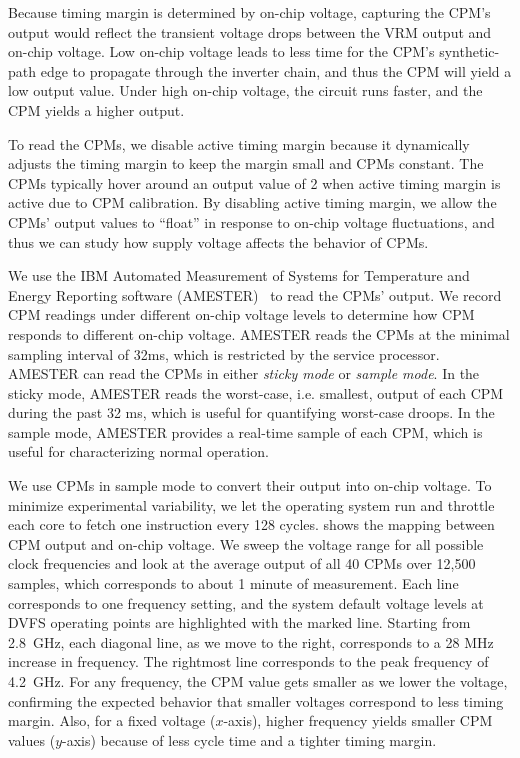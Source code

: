 Because timing margin is determined by on-chip voltage, capturing the CPM's output would reflect the transient voltage drops between the VRM output and on-chip voltage. Low on-chip voltage leads to less time for the CPM's synthetic-path edge to propagate through the inverter chain, and thus the CPM will yield a low output value. Under high on-chip voltage, the circuit runs faster, and the CPM yields a higher output.

To read the CPMs, we disable active timing margin because it dynamically adjusts the timing margin to keep the margin small and CPMs constant. The CPMs typically hover around an output value of 2 when active timing margin is active due to CPM calibration. By disabling active timing margin, we allow the CPMs' output values to ``float'' in response to on-chip voltage fluctuations, and thus we can study how supply voltage affects the behavior of CPMs. 

We use the IBM Automated Measurement of Systems for Temperature and Energy Reporting software (AMESTER)~\cite{floyd2011introducing, AMESTERgithub} to read the CPMs' output. We record CPM readings under different on-chip voltage levels to determine how CPM responds to different on-chip voltage. AMESTER reads the CPMs at the minimal sampling interval of 32ms, which is restricted by the service processor. AMESTER can read the CPMs in either {\it sticky mode} or {\it sample mode}. In the sticky mode, AMESTER reads the worst-case, i.e. smallest, output of each CPM during the past 32 ms, which is useful for quantifying worst-case droops. In the sample mode, AMESTER provides a real-time sample of each CPM, which is useful for characterizing normal operation.

We use CPMs in sample mode to convert their output into on-chip voltage. To minimize experimental variability, we let the operating system run and throttle each core to fetch one instruction every 128 cycles.  shows the mapping between CPM output and on-chip voltage. We sweep the voltage range for all possible clock frequencies and look at the average output of all 40 CPMs over 12,500 samples, which corresponds to about 1 minute of measurement. Each line corresponds to one frequency setting, and the system default voltage levels at DVFS operating points are highlighted with the marked line. Starting from 2.8~GHz, each diagonal line, as we move to the right, corresponds to a 28 MHz increase in frequency. The rightmost line corresponds to the peak frequency of 4.2~GHz. For any frequency, the CPM value gets smaller as we lower the voltage, confirming the expected behavior that smaller voltages correspond to less timing margin. Also, for a fixed voltage ($x$-axis), higher frequency yields smaller CPM values ($y$-axis) because of less cycle time and a tighter timing margin. 

